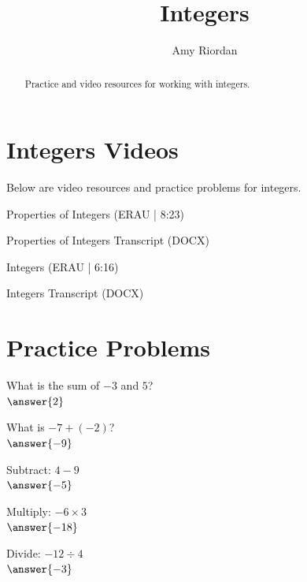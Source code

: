 \documentclass{ximera}
\title{Integers}
\author{Amy Riordan}
\begin{document}
\begin{abstract}
Practice and video resources for working with integers.
\end{abstract}
\maketitle

\section*{Integers Videos}

Below are video resources and practice problems for integers.

Properties of Integers (ERAU | 8:23)


Properties of Integers Transcript (DOCX)

Integers (ERAU | 6:16)


Integers Transcript (DOCX)

\section*{Practice Problems}

\begin{problem}
What is the sum of $-3$ and $5$?\\
$\answer{2}$
\end{problem}

\begin{problem}
What is $-7 + (-2)$?\\
$\answer{-9}$
\end{problem}

\begin{problem}
Subtract: $4 - 9$\\
$\answer{-5}$
\end{problem}

\begin{problem}
Multiply: $-6 \times 3$\\
$\answer{-18}$
\end{problem}

\begin{problem}
Divide: $-12 \div 4$\\
$\answer{-3}$
\end{problem}
\end{document}

